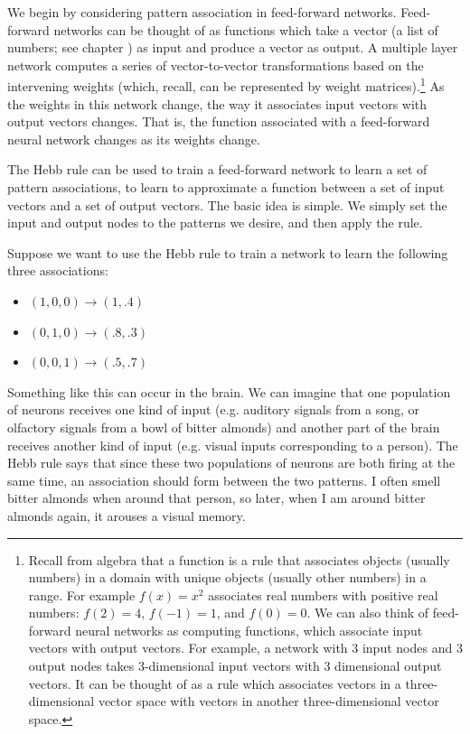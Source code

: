We begin by considering pattern association in feed-forward networks. Feed-forward networks can be thought of as functions which take a vector (a list of numbers; see chapter ) as input and produce a vector as output. A multiple layer network computes a series of vector-to-vector transformations based on the intervening weights (which, recall, can be represented by weight matrices).\footnote{Recall from algebra that a function is a rule that associates objects (usually numbers) in a domain with unique objects (usually other numbers) in a range. For example $f(x) = x^2$ associates real numbers with positive real  numbers: $f(2) = 4$, $f(-1) = 1$, and $f(0) = 0$. We can also think of feed-forward neural networks as  computing functions, which associate input vectors with output vectors. For example, a network with 3 input nodes and 3 output nodes takes 3-dimensional input vectors with 3 dimensional output vectors. It can be thought of as a rule which associates vectors in a three-dimensional vector space with vectors in another three-dimensional vector space.} As the weights in this network change, the way it associates input vectors with output vectors changes. That is,  the function associated with a feed-forward neural network changes as its weights change. 

The Hebb rule can be used to train a feed-forward network to learn a set of pattern associations, to learn to approximate a function between a set of input vectors and a set of output vectors. The basic idea is simple. We simply set the input and output nodes to the patterns we desire, and then apply the rule. 

Suppose we want to use the Hebb rule to train a network to learn the following three associations:
\begin{itemize}
\item $(1,0,0) \rightarrow (1,.4)$
\item $(0,1,0) \rightarrow (.8,.3)$
\item $(0,0,1) \rightarrow (.5,.7)$
\end{itemize}

Something like this can occur in the brain. We can imagine that one population of neurons receives one kind of input (e.g. auditory signals from a song, or olfactory signals from a bowl of bitter almonds) and another part of the brain receives another kind of input (e.g. visual inputs corresponding to a person). The Hebb rule says that since these two populations of neurons are both firing at the same time, an association should form between the two patterns. I often smell bitter almonds when around that person, so later, when I am around bitter almonds again, it arouses a visual memory.

